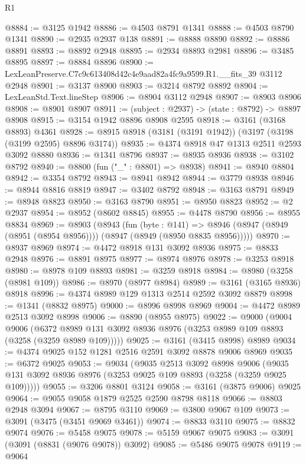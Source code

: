 \begin{lexlean}{R1}
\begin{coremodule}
@8884 := @3125 @1942
@8886 := @4503 @8791 @1341
@8888 := @4503 @8790 @1341
@8890 := @2935 @2937 @138
@8891 := @8888 @8890
@8892 := @8886 @8891
@8893 := @8892 @2948
@8895 := @2934 @8893 @2981
@8896 := @3485 @8895
@8897 := @8884 @8896
@8900 := LexLeanPreserve.C7c9c613408d42c4e9aad82a4fc9a9599.R1.__fits_39 @3112 @2948
@8901 := @3137 @8900
@8903 := @3214 @8792 @8892
@8904 := LexLeanStd.Text.lineStep
@8906 := @8904 @3112 @2948
@8907 := @8903 @8906
@8908 := @8901 @8907
@8911 := (subject : @2937) -> (state : @8792) -> @8897 @8908
@8915 := @3154 @1942 @8896 @8908 @2595
@8918 := @3161 (@3168 @8893) @4361
@8928 := @8915 @8918 (@3181 (@3191 @1942)) (@3197 (@3198 (@3199 @2595) @8896 @3174))
@8935 := @4374 @8918 @47 @1313 @2511 @2593 @3092 @8880
@8936 := @1341 @8796
@8937 := @8935 @8936
@8938 := @3102 @8792
@8940 := @8800 (fun ("_" : @8801) => @8938)
@8941 := @8940 @8804
@8942 := @3354 @8792
@8943 := @8941 @8942
@8944 := @3779 @8938
@8946 := @8944 @8816 @8819
@8947 := @3402 @8792
@8948 := @3163 @8791
@8949 := @8948 @8823
@8950 := @3163 @8790
@8951 := @8950 @8823
@8952 := @2 @2937
@8954 := @8952 (@8602 @8845)
@8955 := @4478 @8790
@8956 := @8955 @8834
@8969 := @8903
    (@8943
      (fun (byte : @141) =>
      @8946 (@8947 (@8949 (@8951 (@8954 @8956)))) (@8947 (@8949 (@8950 @8835 @8956)))))
@8970 := @8937 @8969
@8974 := @4472 @8918 @131 @3092 @8936
@8975 := @8833 @2948
@8976 := @8891 @8975
@8977 := @8974 @8976
@8978 := @3253 @8918
@8980 := @8978 @109 @8893
@8981 := @3259 @8918
@8984 := @8980 (@3258 (@8981 @109))
@8986 := @8970 (@8977 @8984)
@8989 := @3161 (@3165 @8936) @8918
@8996 := @4374 @8989 @129 @1313 @2514 @2592 @3092 @8879
@8998 := @1341 (@8832 @8975)
@9000 := @8996 @8998 @8969
@9004 := @4472 @8989 @2513 @3092 @8998
@9006 := @8890 (@8955 @8975)
@9022 := @9000
    (@9004
      @9006
      (@6372 @8989 @131 @3092 @8936 @8976 (@3253 @8989 @109 @8893 (@3258 (@3259 @8989 @109)))))
@9025 := @3161 (@3415 @8998) @8989
@9034 := @4374 @9025 @152 @1281 @2516 @2591 @3092 @8878 @9006 @8969
@9035 := @6372 @9025
@9053 := @9034
    (@9035
      @2513
      @3092
      @8998
      @9006
      (@9035 @131 @3092 @8936 @8976 (@3253 @9025 @109 @8893 (@3258 (@3259 @9025 @109)))))
@9055 := @3206 @8801 @3124
@9058 := @3161 (@3875 @9006) @9025
@9064 := @9055 @9058 @1879 @2525 @2590 @8798 @8118
@9066 := @8803 @2948 @3094
@9067 := @8795 @3110
@9069 := @3800 @9067 @109
@9073 := @3091 (@3475 (@3451 @9069 @3461))
@9074 := @8833 @3110
@9075 := @8832 @9074
@9076 := @5458 @9075
@9078 := @5159 @9067 @9075
@9083 := @3091 (@3091 (@8831 (@9076 @9078)) @3092)
@9085 := @5486 @9075 @9078
@9119 := @9064

\end{coremodule}
\end{lexlean}
